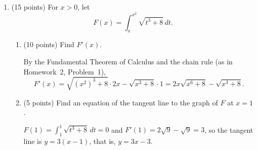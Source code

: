 \documentclass[12pt,letterpaper]{article}
\newcommand{\points}[1]{(#1 points)}
\begin{document}
\begin{enumerate}[label=\textbf{\arabic*.},leftmargin=2em]
\begin{enumerate}[label=(\alph*)]
        \begin{solution}
          Each subinterval has length $\tfrac13$. Since $f$ is decreasing on
          $[1,2]$, its minimum on each subinterval is at the right endpoint
          and its maximum is at the left endpoint. Hence
          \[
            L_f(P)=\frac13\Bigl(\frac34+\frac35+\frac12\Bigr)
              =\frac13\cdot\frac{37}{20}=\frac{37}{60},
            \qquad
            U_f(P)=\frac13\Bigl(1+\frac34+\frac35\Bigr)
              =\frac13\cdot\frac{47}{20}=\frac{47}{60}.
          \]
        \end{solution}
        \vfill

      \item \points{5} Use part (a) to find numbers $A$ and $B$ such that
        \[
          A\le \ln(2) \le B,
        \]
        and explain why these inequalities hold.

        \begin{solution}
          Take $A=L_f(P)$ and $B=U_f(P)$. By the definition of the natural
          logarithm, $\ln 2=\int_1^2\frac{dx}{x}$ (or by the Fundamental
          Theorem of Calculus, since $\frac{d}{dx}\ln x=\frac1x$), and the
          integral lies between every lower sum and every upper sum, so
          \[
            \frac{37}{60}\le\ln 2=\int_1^2\frac{dx}{x}\le\frac{47}{60}.
          \]
        \end{solution}
        \vfill
    \end{enumerate}
    \newpage

  \item \points{15}
    For $x>0$, let
    \[
      F(x)=\int_{x}^{x^2}\sqrt{t^3+8}\,dt.
    \]
    \begin{enumerate}[label=(\alph*)]
      \item \points{10} Find $F'(x)$.

        \begin{solution}
          By the Fundamental Theorem of Calculus and the chain rule (as in
          Homework~2, Problem~1),
          \[
            F'(x)=\sqrt{(x^2)^3+8}\cdot 2x-\sqrt{x^3+8}\cdot 1
              =2x\sqrt{x^6+8}-\sqrt{x^3+8}.
          \]
        \end{solution}
        \vfill

      \item \points{5} Find an equation of the tangent line to the graph of
        $F$ at $x=1$.

        \begin{solution}
          $F(1)=\int_1^1\sqrt{t^3+8}\,dt=0$ and $F'(1)=2\sqrt9-\sqrt9=3$, so
          the tangent line is $y=3(x-1)$, that is, $y=3x-3$.
        \end{solution}
        \vfill
    \end{enumerate}
    \newpage


\end{enumerate}
\end{document}
